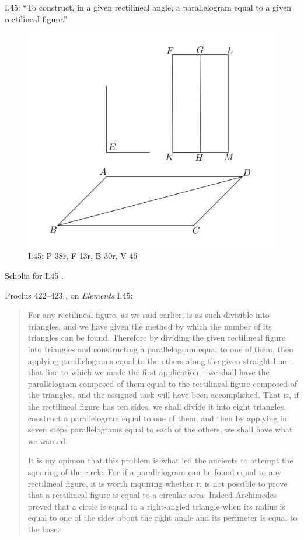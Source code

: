 \documentclass{article}
\begin{document}
I.45: ``To construct, in a given rectilineal angle, a parallelogram
equal to a given rectilineal figure.''

\begin{figure}
\begin{center}
\includegraphics{I45.png}
\end{center}
\caption{I.45: P 38r, F 13r, B 30r, V 46}
\label{I45}
\end{figure}

Scholia for I.45 \cite[pp.~207--209]{euclidisV}.


Proclus 422--423 \cite[pp.~334--335]{proclus}, on {\em Elements} I.45:

\begin{quote}
For any 
rectilineal figure, as we said earlier, is as such divisible into
triangles, and we have given the method by which the number
of its triangles can be found. Therefore by dividing the
given rectilineal figure into triangles and constructing a
parallelogram equal to one of them, then applying parallelograms
equal to the others along the given straight line -- that
line to which we made the first application -- we shall have the
parallelogram composed of them equal to the rectilineal figure
composed of the triangles, and the assigned task will have been
accomplished. That is, if the rectilineal figure has ten sides,
we shall divide it into eight triangles, construct a parallelogram
equal to one of them, and then by applying in seven
steps parallelograms equal to each of the others, we shall
have what we wanted.

It is my opinion that this problem is what led the ancients
to attempt the squaring of the circle. For if a parallelogram
can be found equal to any rectilineal figure, it is worth
inquiring whether it is not possible to prove that a rectilineal 
figure is equal to a circular area. Indeed Archimedes proved
that a circle is equal to a right-angled triangle when its radius
is equal to one of the sides about the right angle and its
perimeter is equal to the base.
\end{quote}
\end{document}
